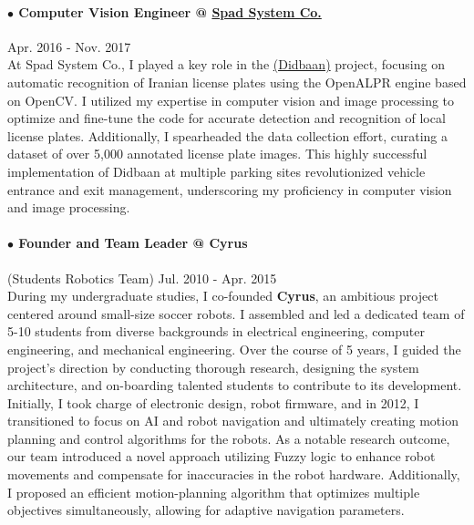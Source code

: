 \documentclass[10pt]{res}
\begin{document}
\begin{resume}
\vspace{-12pt}

\paragraph{$\bullet$ Computer Vision Engineer @ \href{http://www.spadsystem.com/}{Spad System Co.} } \hfill Apr. 2016 - Nov. 2017\\
At Spad System Co., I played a key role in the \href{http://didbaan.com}{(Didbaan)} project, focusing on automatic recognition of Iranian license plates using the OpenALPR engine based on OpenCV. I utilized my expertise in computer vision and image processing to optimize and fine-tune the code for accurate detection and recognition of local license plates. Additionally, I spearheaded the data collection effort, curating a dataset of over 5,000 annotated license plate images. This highly successful implementation of Didbaan at multiple parking sites revolutionized vehicle entrance and exit management, underscoring my proficiency in computer vision and image processing.



\paragraph{$\bullet$ Founder and Team Leader @ {Cyrus}} (Students Robotics Team) \hfill Jul. 2010 - Apr. 2015\\
During my undergraduate studies, I co-founded \textbf{Cyrus}, an ambitious project centered around small-size soccer robots. I assembled and led a dedicated team of 5-10 students from diverse backgrounds in electrical engineering, computer engineering, and mechanical engineering. Over the course of 5 years, I guided the project's direction by conducting thorough research, designing the system architecture, and on-boarding talented students to contribute to its development. Initially, I took charge of electronic design, robot firmware, and in 2012, I transitioned to focus on AI and robot navigation and ultimately creating motion planning and control algorithms for the robots. As a notable research outcome, our team introduced a novel approach utilizing Fuzzy logic to enhance robot movements and compensate for inaccuracies in the robot hardware. Additionally, I proposed an efficient motion-planning algorithm that optimizes multiple objectives simultaneously, allowing for adaptive navigation parameters.





\end{resume}
\end{document}
